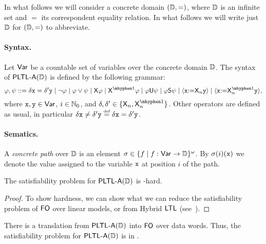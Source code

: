 In what follows we will consider a concrete domain $(\mathbb{D},=)$, where $\mathbb{D}$ is an infinite set and $=$ its correspondent equality relation. In what follows we will write just $\mathbb{D}$ for $(\mathbb{D},=)$ to abbreviate.

\paragraph{Syntax.} Let ${\rm \sf Var}$ be a countable set of variables over the concrete domain $\mathbb{D}$. The syntax of ${\rm\textsf{PLTL-A}}(\mathbb{D})$ is defined by the following grammar:
\[
    \aformula,\aformulabis ::= \delta\avar = \delta'\avarbis \mid \neg\aformula \mid \aformula \vee \aformulabis \mid \Next\aformula \mid \Prev\aformula \mid \aformula \Until \aformulabis \mid \aformula\Since\aformulabis \mid \Assign{\avar}{\Nextn\avarbis} \mid \Assign{\avar}{\Prevn\avarbis},
\]
where $\mathtt{x},\mathtt{y}\in{\rm \sf Var}$, $i\in\mathbb{N}_0$, and $\delta,\delta'\in\{\Nextn,\Prevn\}$. Other operators are defined as usual, in particular $\delta\avar \neq \delta'\avarbis\egdef \delta\avar = \delta'\avarbis$.

\paragraph{Sematics.} A \emph{concrete path} over $\mathbb{D}$ is an element $\sigma\in\{f\mid f:{\rm \sf Var}\to\mathbb{D}\}^\omega$. By $\sigma(i)(\mathtt{x})$ we denote the value assigned to the variable $\mathtt{x}$ at position $i$ of the path.


\begin{theorem}
 The satisfiability problem for ${\rm\textsf{PLTL-A}}(\mathbb{D})$ is \tower-hard.
\end{theorem}

\begin{proof}
    To show hardness, we can show what we can reduce the satisfiability problem of ${\rm\textsf{FO}}$ over linear models, or from Hybrid ${\rm\textsf{LTL}}$ (see~\cite{FranceschetRS03}).

\end{proof}

\begin{conjecture}
    There is a translation from ${\rm\textsf{PLTL-A}}(\mathbb{D})$ into ${\rm\textsf{FO}}$ over data words. Thus, the satisfiability problem for ${\rm\textsf{PLTL-A}}(\mathbb{D})$ is in \ack.
\end{conjecture}

